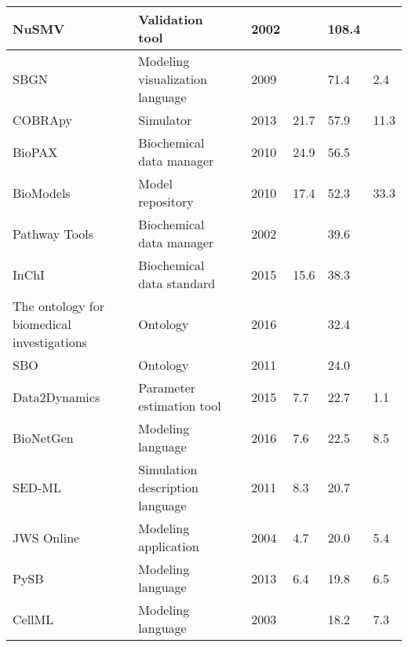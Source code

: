 \begin{longtable}{L{2.2cm}L{4cm}L{1cm}L{0.8cm}R{1.1cm}R{1cm}R{1cm}}
\midrule
\small{NuSMV} &\small{Validation tool} &\cite{Cimatti2002NuSMVChecking} &\small{2002} &\small{} &\small{108.4} &\small{}\\
\midrule
\small{SBGN} &\small{Modeling visualization language} &\cite{Novere2009TheNotation} &\small{2009} &\small{} &\small{71.4} &\small{2.4}\\
\midrule
\small{COBRApy} &\small{Simulator} &\cite{ebrahim2013cobrapy} &\small{2013} &\small{21.7} &\small{57.9} &\small{11.3}\\
\midrule
\small{BioPAX} &\small{Biochemical data manager} &\cite{Demir2010TheSharing.} &\small{2010} &\small{24.9} &\small{56.5} &\small{}\\
\midrule
\small{BioModels} &\small{Model repository} &\cite{Li2010BioModelsModelsb} &\small{2010} &\small{17.4} &\small{52.3} &\small{33.3}\\
\midrule
\small{Pathway Tools} &\small{Biochemical data manager} &\cite{karp2002pathway} &\small{2002} &\small{} &\small{39.6} &\small{}\\
\midrule
\small{InChI} &\small{Biochemical data standard} &\cite{Heller2015InChIIdentifier.} &\small{2015} &\small{15.6} &\small{38.3} &\small{}\\
\midrule
\small{The ontology for biomedical investigations} &\small{Ontology} &\cite{Bandrowski2016TheInvestigations} &\small{2016} &\small{} &\small{32.4} &\small{}\\
\midrule
\small{SBO} &\small{Ontology} &\cite{Courtot2011ControlledBiology.} &\small{2011} &\small{} &\small{24.0} &\small{}\\
\midrule
\small{Data2Dynamics} &\small{Parameter estimation tool} &\cite{Raue2015Data2Dynamics:Systems} &\small{2015} &\small{7.7} &\small{22.7} &\small{1.1}\\
\midrule
\small{BioNetGen} &\small{Modeling language} &\cite{Harris2016BioNetGenModeling} &\small{2016} &\small{7.6} &\small{22.5} &\small{8.5}\\
\midrule
\small{SED-ML} &\small{Simulation description language} &\cite{Waltemath2011ReproducibleLanguage} &\small{2011} &\small{8.3} &\small{20.7} &\small{}\\
\midrule
\small{JWS Online} &\small{Modeling application} &\cite{Olivier2004Web-basedOnline} &\small{2004} &\small{4.7} &\small{20.0} &\small{5.4}\\
\midrule
\small{PySB} &\small{Modeling language} &\cite{Lopez2013ProgrammingPySB} &\small{2013} &\small{6.4} &\small{19.8} &\small{6.5}\\
\midrule
\small{CellML} &\small{Modeling language} &\cite{Cuellar2003AnLanguage} &\small{2003} &\small{} &\small{18.2} &\small{7.3}\\

\end{longtable}
